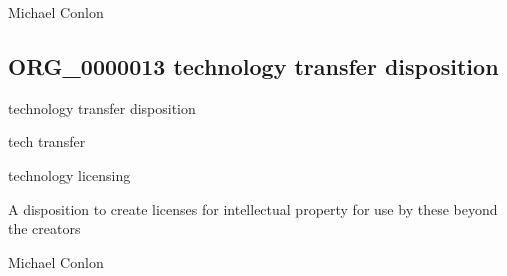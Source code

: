 \documentclass[letterpaper,10pt,english]{sphinxmanual}
\begin{document}
\begin{sphinxShadowBox}

\sphinxAtStartPar
Michael Conlon 
\end{sphinxShadowBox}
\begin{quote}

\ignorespaces \end{quote}


\subsection{ORG\_0000013 \sphinxhyphen{} technology transfer disposition}
\label{\detokenize{doc-ORG_0000013:org-0000013-technology-transfer-disposition}}\label{\detokenize{doc-ORG_0000013:index-0}}\label{\detokenize{doc-ORG_0000013::doc}}
\begin{sphinxShadowBox}

\sphinxAtStartPar
technology transfer disposition
\end{sphinxShadowBox}

\begin{sphinxShadowBox}

\sphinxAtStartPar
tech transfer

\sphinxAtStartPar
technology licensing
\end{sphinxShadowBox}

\begin{sphinxShadowBox}

\sphinxAtStartPar
{\hyperref[\detokenize{doc-BFO_0000016::doc}]{}}
\end{sphinxShadowBox}

\begin{sphinxShadowBox}

\sphinxAtStartPar
A disposition to create licenses for intellectual property for use by these beyond the creators
\end{sphinxShadowBox}

\begin{sphinxShadowBox}

\sphinxAtStartPar
Michael Conlon 
\end{sphinxShadowBox}
\end{document}
